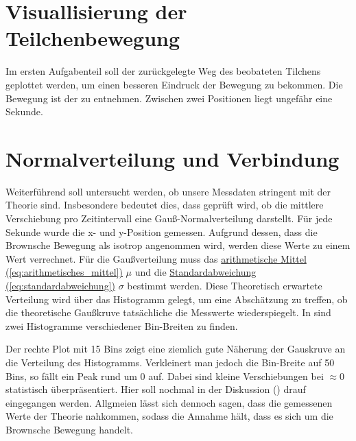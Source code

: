 \newpage

\section{Visuallisierung der Teilchenbewegung}
\label{sec:A1}
Im ersten Aufgabenteil soll der zurückgelegte Weg des beobateten Tilchens geplottet werden, um einen besseren Eindruck der Bewegung zu bekommen.
Die Bewegung ist der  zu entnehmen. Zwischen zwei Positionen liegt ungefähr eine Sekunde.


\section{Normalverteilung und Verbindung}
\label{sec:A2}
Weiterführend soll untersucht werden, ob unsere Messdaten stringent mit der Theorie sind. Insbesondere bedeutet dies, dass geprüft wird, ob die mittlere Verschiebung pro Zeitintervall eine Gauß-Normalverteilung darstellt.
Für jede Sekunde wurde die x- und y-Position gemessen. Aufgrund dessen, dass die Brownsche Bewegung als isotrop angenommen wird, werden diese Werte zu einem Wert verrechnet.
Für die Gaußverteilung muss das \hyperref[eq:arithmetisches_mittel]{arithmetische Mittel (\ref*{eq:arithmetisches_mittel})} $\mu$ und die \hyperref[eq:standardabweichung]{Standardabweichung (\ref*{eq:standardabweichung})} $\sigma$ bestimmt werden.
Diese Theoretisch erwartete Verteilung wird über das Histogramm gelegt, um eine Abschätzung zu treffen, ob die theoretische Gaußkruve tatsächliche die Messwerte wiederspiegelt. 
In  sind zwei Histogramme verschiedener Bin-Breiten zu finden. 


Der rechte Plot mit 15 Bins zeigt eine ziemlich gute Näherung der Gauskruve an die Verteilung des Histogramms. Verkleinert man jedoch die Bin-Breite auf 50 Bins, so fällt ein Peak rund um $0$ auf. 
Dabei sind kleine Verschiebungen bei $\approx 0$ statistisch überpräsentiert. Hier soll nochmal in der Diskussion () drauf eingegangen werden. 
Allgmeien lässt sich dennoch sagen, dass die gemessenen Werte der Theorie nahkommen, sodass die Annahme hält, dass es sich um die Brownsche Bewegung handelt. 

